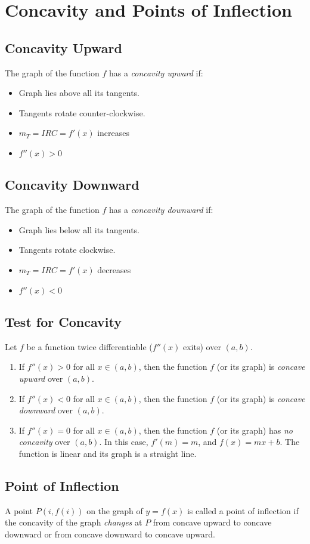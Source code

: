 \section{Concavity and Points of Inflection}
\subsection{Concavity Upward}
	The graph of the function $f$ has a \emph{concavity upward} if:
	\begin{itemize}
		\item Graph lies above all its tangents.
		\item Tangents rotate counter-clockwise.
		\item $m_T = IRC = f'(x)$ increases
		\item $f''(x) > 0$
	\end{itemize}
\subsection{Concavity Downward}
	The graph of the function $f$ has a \emph{concavity downward} if:
	\begin{itemize}
		\item Graph lies below all its tangents.
		\item Tangents rotate clockwise.
		\item $m_T = IRC = f'(x)$ decreases
		\item $f''(x) < 0$
	\end{itemize}
\subsection{Test for Concavity}
	Let $f$ be a function twice differentiable ($f''(x)$ exits) over $(a,b)$.
	\begin{enumerate}
		\item If $f''(x) > 0$ for all $x \in (a,b)$, then the function $f$ (or its graph) is \emph{concave upward} over $(a,b)$.
		\item If $f''(x) < 0$ for all $x \in (a,b)$, then the function $f$ (or its graph) is \emph{concave downward} over $(a,b)$.
		\item If $f''(x) = 0$ for all $x \in (a,b)$, then the function $f$ (or its graph) has \emph{no concavity} over $(a,b)$. In this case, $f'(m) = m$, and $f(x) = mx + b$. The function is linear and its graph is a straight line.
	\end{enumerate}
\subsection{Point of Inflection}
	A point $P(i,f(i))$ on the graph of $y=f(x)$ is called a point of inflection if the concavity of the graph \emph{changes} at $P$ from concave upward to concave downward or from concave downward to concave upward.
